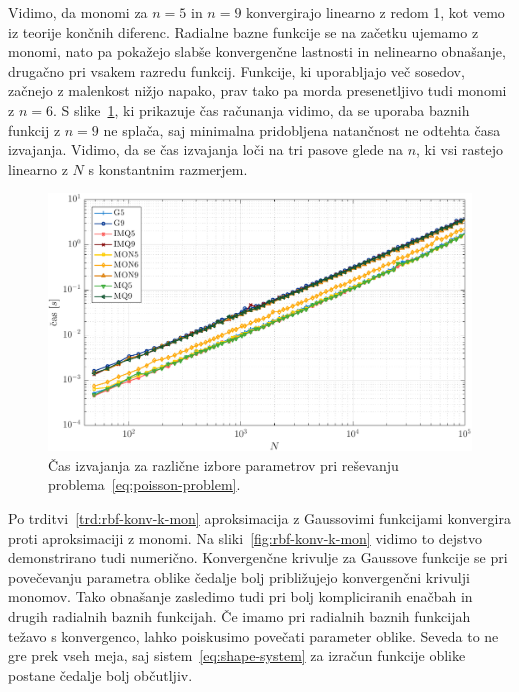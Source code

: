 \documentclass[a4paper,twoside]{article}
\theoremstyle{definition} %
\theoremstyle{plain} %
\numberwithin{equation}{section}
\newlength{\iw}
\begin{document}
Vidimo, da monomi za $n=5$ in $n=9$ konvergirajo linearno z redom 1, kot vemo iz
teorije končnih diferenc. Radialne bazne funkcije se na začetku ujemamo z
monomi, nato pa pokažejo slabše konvergenčne lastnosti in nelinearno obnašanje,
drugačno pri vsakem razredu funkcij. Funkcije, ki uporabljajo več sosedov,
začnejo z malenkost nižjo napako, prav tako pa morda presenetljivo tudi
monomi z $n=6$. S slike~\ref{fig:poisson-square-time},
ki prikazuje čas računanja vidimo, da se uporaba baznih funkcij z $n = 9$
ne splača, saj minimalna pridobljena natančnost ne odtehta časa izvajanja.
Vidimo, da se čas izvajanja loči na tri pasove glede na $n$, ki vsi
rastejo linearno z $N$ s konstantnim razmerjem.

\begin{figure}[h]
  \centering
  \includegraphics[width=\iw]{images/poisson_square_time.pdf}
  \caption{Čas izvajanja za različne izbore parametrov pri reševanju
  problema~\eqref{eq:poisson-problem}.}
  \label{fig:poisson-square-time}
\end{figure}

Po trditvi~\ref{trd:rbf-konv-k-mon} aproksimacija z Gaussovimi funkcijami
konvergira proti aproksimaciji z monomi. Na sliki~\ref{fig:rbf-konv-k-mon}
vidimo to dejstvo demonstrirano tudi numerično. Konvergenčne krivulje za
Gaussove funkcije se pri povečevanju parametra oblike čedalje bolj približujejo
konvergenčni krivulji monomov. Tako obnašanje zasledimo tudi pri bolj
kompliciranih enačbah in drugih radialnih baznih funkcijah. Če imamo pri radialnih
baznih funkcijah težavo s konvergenco, lahko poiskusimo povečati parameter
oblike. Seveda to ne gre prek vseh meja, saj sistem~\eqref{eq:shape-system}
za izračun funkcije oblike postane čedalje bolj občutljiv.
\end{document}
